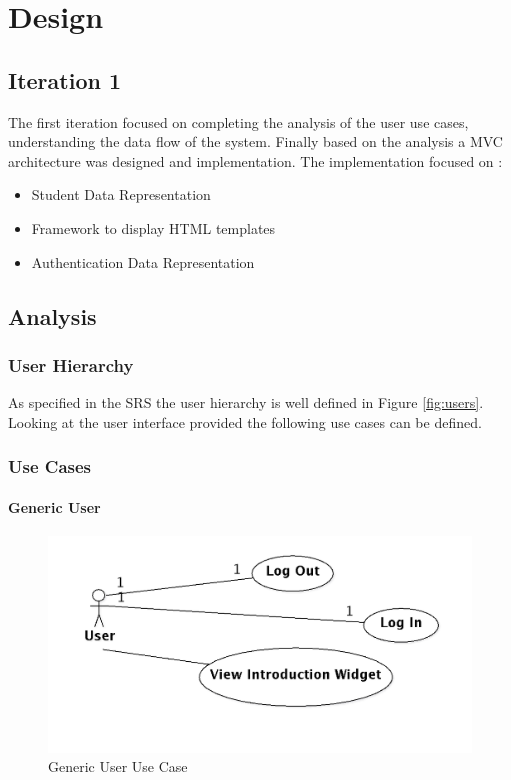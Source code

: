 \documentclass[11pt,a4paper]{report}
\begin{document}
\chapter{Design}
\section{Iteration 1}

The first iteration focused on completing the analysis of the user use cases, understanding the data flow of the system. Finally based on the analysis a MVC architecture was designed and implementation. The implementation focused on :

\begin{itemize}
\item Student Data Representation 
\item Framework to display HTML templates
\item Authentication Data Representation 
\end{itemize}

\section{Analysis}

\subsection{User Hierarchy}
As specified in the SRS the user hierarchy is well defined in Figure \ref{fig:users}. Looking at the user interface provided the following use cases can be 
defined.

\subsection{Use Cases}

\subsubsection{Generic User}

\begin{figure}[htp]
\centering
\includegraphics[scale=0.25]{diagrams/use_cases/User_uc.png}
\caption{Generic User Use Case}
\label{fig:UserLog}
\end{figure}
\end{document}
